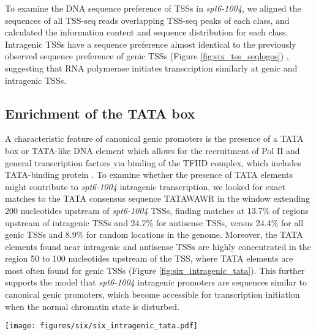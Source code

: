 To examine the DNA sequence preference of TSSs in \textit{spt6-1004}, we aligned the sequences of all TSS-seq reads overlapping TSS-seq peaks of each class, and calculated the information content and sequence distribution for each class.
Intragenic TSSs have a sequence preference almost identical to the previously observed sequence preference of genic TSSs (Figure \ref{fig:six_tss_seqlogos}) \citep{malabat2015}, suggesting that RNA polymerase initiates transcription similarly at genic and intragenic TSSs.

\subsection{Enrichment of the TATA box}

A characteristic feature of canonical genic promoters is the presence of a TATA box or TATA-like DNA element which allows for the recruitment of Pol II and general transcription factors via binding of the TFIID complex, which includes TATA-binding protein \citep{rhee2012}.
To examine whether the presence of TATA elements might contribute to \textit{spt6-1004} intragenic transcription, we looked for exact matches to the TATA consensus sequence TATAWAWR in the window extending 200 nucleotides upstream of \textit{spt6-1004} TSSs, finding matches at 13.7\% of regions upstream of intragenic TSSs and 24.7\% for antisense TSSs, versus 24.4\% for all genic TSSs and 8.9\% for random locations in the genome.
Moreover, the TATA elements found near intragenic and antisense TSSs are highly concentrated in the region 50 to 100 nucleotides upstream of the TSS, where TATA elements are most often found for genic TSSs (Figure \ref{fig:six_intragenic_tata}).
This further supports the model that \textit{spt6-1004} intragenic promoters are sequences similar to canonical genic promoters, which become accessible for transcription initiation when the normal chromatin state is disturbed.

\begin{SCfigure}[50][h]
    \centering
    \texttt{[image: figures/six/six\_intragenic\_tata.pdf]}
    \caption[Kernel density estimate of matches to a consensus TATA-box motif upstream of genic and \textit{spt6-1004}-induced intragenic TSSs.]{Scaled density of exact matches to the motif TATAWAWR upstream of TSSs. For each category, a Gaussian kernel density estimate of the positions of motif occurrences is scaled by the number of motif occurrences per region.}
    \label{fig:six_intragenic_tata}
\end{SCfigure}

